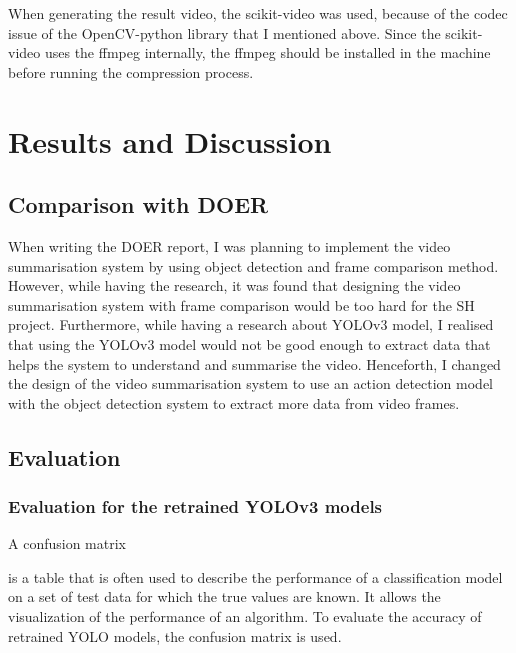 \documentclass{article}
\begin{document}
When generating the result video, the scikit-video was used, because of the codec issue of the OpenCV-python library that I mentioned above. Since the scikit-video uses the ffmpeg internally, the ffmpeg should be installed in the machine before running the compression process.


\section{Results and Discussion}

\subsection{Comparison with DOER}

When writing the DOER report, I was planning to implement the video summarisation system by using object detection and frame comparison method. However, while having the research, it was found that designing the video summarisation system with frame comparison would be too hard for the SH project. Furthermore, while having a research about YOLOv3 model, I realised that using the YOLOv3 model would not be good enough to extract data that helps the system to understand and summarise the video. Henceforth, I changed the design of the video summarisation system to use an action detection model with the object detection system to extract more data from video frames.

\subsection{Evaluation}

\subsubsection{Evaluation for the retrained YOLOv3 models}

\hypertarget{evaluate_yolo_with_cm}{A confusion matrix} is a table that is often used to describe the performance of a classification model on a set of test data for which the true values are known. It allows the visualization of the performance of an algorithm. To evaluate the accuracy of retrained YOLO models, the confusion matrix is used.
\end{document}
